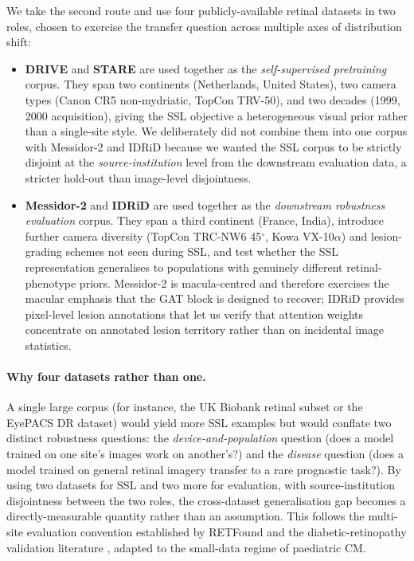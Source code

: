\documentclass[twocolumn,10pt]{article}
\begin{document}
We take the second route and use four publicly-available
retinal datasets in two roles, chosen to exercise the transfer
question across multiple axes of distribution shift:

\begin{itemize}[leftmargin=*,nosep]
\item \textbf{DRIVE} and \textbf{STARE} are used together as the
  \emph{self-supervised pretraining} corpus. They span two
  continents (Netherlands, United States), two camera types
  (Canon CR5 non-mydriatic, TopCon TRV-50), and two decades
  (1999, 2000 acquisition), giving the SSL objective a
  heterogeneous visual prior rather than a single-site style. We
  deliberately did not combine them into one corpus with
  Messidor-2 and IDRiD because we wanted the SSL corpus to be
  strictly disjoint at the \emph{source-institution} level from
  the downstream evaluation data, a stricter hold-out than
  image-level disjointness.

\item \textbf{Messidor-2} and \textbf{IDRiD} are used together
  as the \emph{downstream robustness evaluation} corpus. They
  span a third continent (France, India), introduce further
  camera diversity (TopCon TRC-NW6 45$^{\circ}$, Kowa VX-10$\alpha$)
  and lesion-grading schemes not seen during SSL, and test
  whether the SSL representation generalises to populations
  with genuinely different retinal-phenotype priors. Messidor-2
  is macula-centred and therefore exercises the macular
  emphasis that the GAT block is designed to recover; IDRiD
  provides pixel-level lesion annotations that let us verify
  that attention weights concentrate on annotated lesion
  territory rather than on incidental image statistics.
\end{itemize}

\paragraph{Why four datasets rather than one.}
A single large corpus (for instance, the UK Biobank retinal
subset or the EyePACS DR dataset) would yield more SSL examples
but would conflate two distinct robustness questions: the
\emph{device-and-population} question (does a model trained on
one site's images work on another's?) and the \emph{disease}
question (does a model trained on general retinal imagery
transfer to a rare prognostic task?). By using two datasets for
SSL and two more for evaluation, with source-institution
disjointness between the two roles, the cross-dataset generalisation
gap becomes a directly-measurable quantity rather than an
assumption. This follows the multi-site evaluation convention
established by RETFound \cite{Zhou2023RETFound} and the
diabetic-retinopathy validation literature
\cite{Gulshan2016,Abramoff2018IDx}, adapted to the small-data
regime of paediatric CM.
\end{document}
